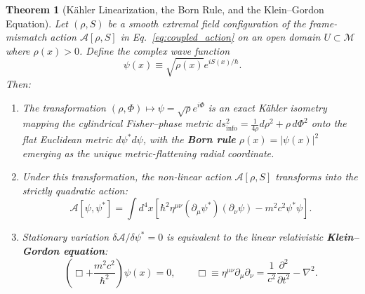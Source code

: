 \documentclass[11pt, a4paper]{article}
\newtheorem{theorem}{Theorem}[section]
\theoremstyle{definition}
\begin{document}
\begin{theorem}[K\"{a}hler Linearization, the Born Rule, and the Klein--Gordon Equation]
\label{thm:kahler}
Let $(\rho, S)$ be a smooth extremal field configuration of the frame-mismatch action $\mathcal{A}[\rho, S]$ in Eq.~\eqref{eq:coupled_action} on an open domain $U \subset \mathcal{M}$ where $\rho(x) > 0$. Define the complex wave function
\begin{equation}
\label{eq:psi_def}
\psi(x) \equiv \sqrt{\rho(x)} e^{i S(x)/\hbar}.
\end{equation}
Then:
\begin{enumerate}[label=(\roman*)]
    \item The transformation $(\rho, \Phi) \mapsto \psi = \sqrt{\rho}e^{i\Phi}$ is an exact K\"{a}hler isometry mapping the cylindrical Fisher--phase metric $ds^2_{\text{info}} = \frac{1}{4\rho} d\rho^2 + \rho \, d\Phi^2$ onto the flat Euclidean metric $d\psi^* d\psi$, with the \textbf{Born rule} $\rho(x) = |\psi(x)|^2$ emerging as the unique metric-flattening radial coordinate.
    \item Under this transformation, the non-linear action $\mathcal{A}[\rho, S]$ transforms into the strictly quadratic action:
    \begin{equation}
    \label{eq:KG_action}
    \mathcal{A}[\psi, \psi^*] = \int d^4x \left[ \hbar^2 \eta^{\mu\nu} (\partial_\mu \psi^*)(\partial_\nu \psi) - m^2 c^2 \psi^* \psi \right].
    \end{equation}
    \item Stationary variation $\delta \mathcal{A} / \delta \psi^* = 0$ is equivalent to the linear relativistic \textbf{Klein--Gordon equation}:
    \begin{equation}
    \label{eq:KG_eq}
    \left( \Box + \frac{m^2 c^2}{\hbar^2} \right) \psi(x) = 0, \qquad \Box \equiv \eta^{\mu\nu}\partial_\mu \partial_\nu = \frac{1}{c^2}\frac{\partial^2}{\partial t^2} - \nabla^2.
    \end{equation}
\end{enumerate}
\end{theorem}
\end{document}
